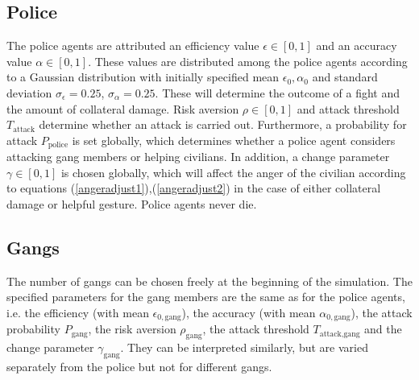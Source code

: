 \documentclass[11pt]{article}
\begin{document}
\subsection{Police}
The police agents are attributed an efficiency value $\epsilon\in [0,1]$ and an accuracy value $\alpha\in [0,1]$. These values are distributed among the police agents according to a Gaussian distribution with initially specified mean $\epsilon_0,\alpha_0$ and standard deviation $\sigma_\epsilon=0.25$, $\sigma_\alpha=0.25$. These will determine the outcome of a fight and the amount of collateral damage. Risk aversion $\rho\in [0,1]$ and attack threshold $T_{\text{attack}}$ determine whether an attack is carried out. Furthermore, a probability for attack $P_{\text{police}}$ is set globally, which determines whether a police agent considers attacking gang members or helping civilians. In addition, a change parameter $\gamma\in [0,1]$ is chosen globally, which will affect the anger of the civilian according to equations (\ref{angeradjust1}),(\ref{angeradjust2}) in the case of either collateral damage or helpful gesture. Police agents never die.
\subsection{Gangs}
The number of gangs can be chosen freely at the beginning of the simulation. The specified parameters for the gang members are the same as for the police agents, i.e. the efficiency (with mean $\epsilon_{0,\text{gang}}$), the accuracy (with mean $\alpha_{0,\text{gang}}$), the attack probability $P_{\text{gang}}$, the risk aversion $\rho_{\text{gang}}$, the attack threshold $T_{\text{attack,gang}}$ and the change parameter $\gamma_{\text{gang}}$. They can be interpreted similarly, but are varied separately from the police but not for different gangs. 
\end{document}
